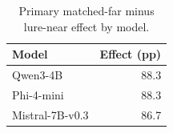 \begin{table}[t]
\centering
\caption{Primary matched-far minus lure-near effect by model.}
\label{tab:model}
\begin{tabular}{lr}
\toprule
Model & Effect (pp) \\
\midrule
Qwen3-4B & 88.3 \\
Phi-4-mini & 88.3 \\
Mistral-7B-v0.3 & 86.7 \\
\bottomrule
\end{tabular}
\end{table}
